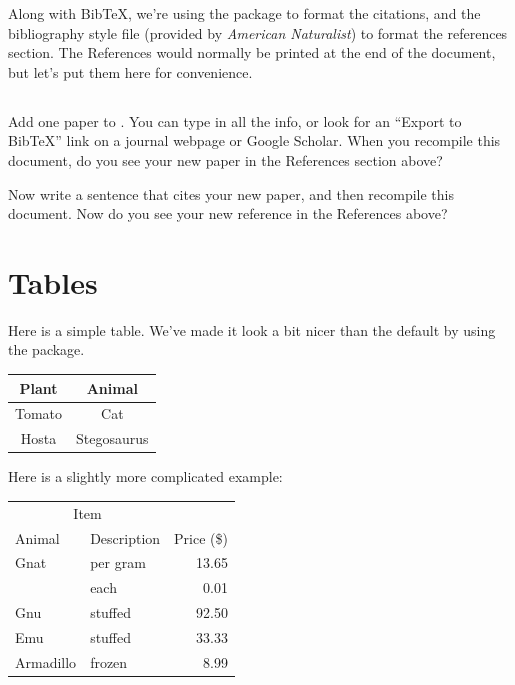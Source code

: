 \documentclass{article}
\begin{document}
Along with BibTeX, we're using the package  to format the citations, and the bibliography style file  (provided by \emph{American Naturalist}) to format the references section.
The References would normally be printed at the end of the document, but let's put them here for convenience.


\subsection*{\task}

Add one paper to .
You can type in all the info, or look for an ``Export to BibTeX'' link on a journal webpage or Google Scholar.
When you recompile this document, do you see your new paper in the References section above?

Now write a sentence that cites your new paper, and then recompile this document.
Now do you see your new reference in the References above?

\section{Tables}
\label{sec:tables}

Here is a simple table.
We've made it look a bit nicer than the default by using the  package.

\begin{tabular}{cc}
\toprule
Plant  & Animal      \\
\midrule
Tomato & Cat         \\
Hosta  & Stegosaurus \\
\bottomrule
\end{tabular}

Here is a slightly more complicated example:

\begin{center}
\begin{tabular}{llr}  
  \toprule
  \multicolumn{2}{c}{Item} \\
  \cmidrule(r){1-2}
  Animal    & Description & Price (\$) \\
  \midrule
  Gnat      & per gram    & 13.65      \\
            &    each     & 0.01       \\
  Gnu       & stuffed     & 92.50      \\
  Emu       & stuffed     & 33.33      \\
  Armadillo & frozen      & 8.99       \\
  \bottomrule
\end{tabular}
\end{center}
\end{document}
